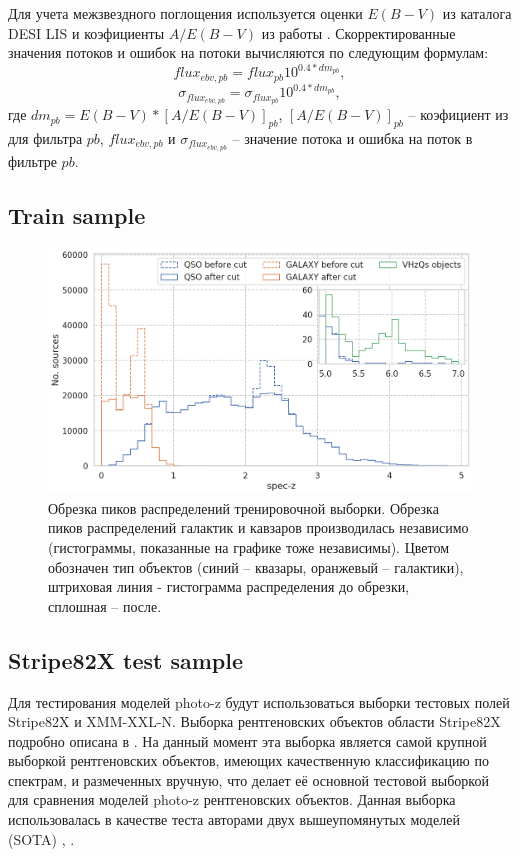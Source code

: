 \documentclass[fleqn,usenatbib]{mnras}
\begin{document}
Для учета межзвездного поглощения используется оценки $E(B-V)$ из каталога DESI LIS и коэфициенты $A/E(B-V)$ из работы \citep{2011ApJ...737..103S}. Скорректированные значения потоков и ошибок на потоки вычисляются по следующим формулам:
\begin{equation}
    flux_{ebv, pb} = flux_{pb} 10^{0.4 * dm_{pb}},
\end{equation}
\begin{equation}
    \sigma_{flux_{ebv, pb}} = \sigma_{flux_{pb}} 10^{0.4 * dm_{pb}},
\end{equation}
где $dm_{pb} = E(B-V) * [A/E(B-V)]_{pb}$, $[A/E(B-V)]_{pb}$ -- коэфициент из \citep{2011ApJ...737..103S} для фильтра $pb$, $flux_{ebv, pb}$ и $\sigma_{flux_{ebv, pb}}$ -- значение потока и ошибка на поток в фильтре $pb$.

\subsection{Train sample}

\begin{figure}
    \centering
    \includegraphics[width=0.95\linewidth]{images/train-peaks-cut.png}
    \caption{Обрезка пиков распределений тренировочной выборки. Обрезка пиков распределений галактик и кавзаров производилась независимо (гистограммы, показанные на графике тоже независимы). Цветом обозначен тип объектов (синий -- квазары, оранжевый -- галактики), штриховая линия - гистограмма распределения до обрезки, сплошная -- после.}
    \label{fig:train-peaks-cut}
\end{figure}

\subsection{Stripe82X test sample}
Для тестирования моделей photo-z будут использоваться выборки тестовых полей Stripe82X и XMM-XXL-N. Выборка рентгеновских объектов области Stripe82X подробно описана в \cite{bib:ananna2017}. На данный момент эта выборка является самой крупной выборкой рентгеновских объектов, имеющих качественную классификацию по спектрам, и размеченных вручную, что делает её основной тестовой выборкой для сравнения моделей photo-z рентгеновских объектов. Данная выборка использовалась в качестве теста авторами двух вышеупомянутых моделей (SOTA) \cite{bib:ananna2017}, \cite{bib:brescia2018}. 
\end{document}
